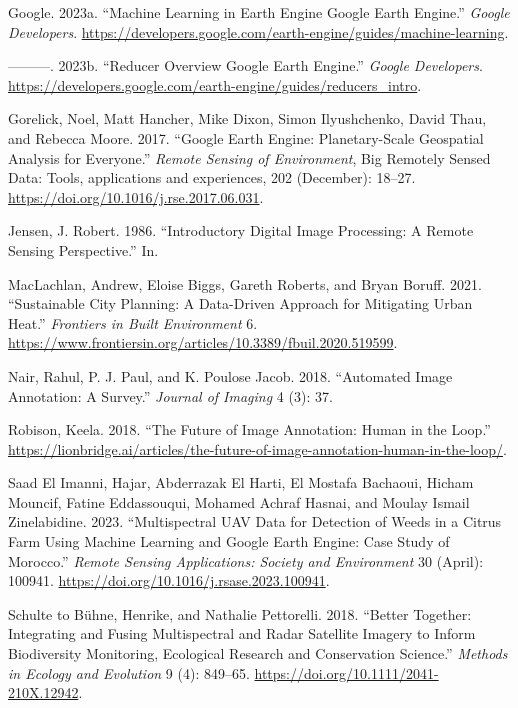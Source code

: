 \documentclass[
  letterpaper,
  DIV=11,
  numbers=noendperiod]{scrreprt}
\newlength{\cslhangindent}
\newlength{\cslentryspacingunit} %
\newenvironment{CSLReferences}[2] %
 {%
  \setlength{\parindent}{0pt}
  \ifodd #1
  \let\oldpar\par
  \def\par{\hangindent=\cslhangindent\oldpar}
  \fi
  \setlength{\parskip}{#2\cslentryspacingunit}
 }%
 {}
\begin{document}
\hypertarget{refs}{}
\begin{CSLReferences}{1}{0}
\leavevmode{}%
Google. 2023a. {``Machine {Learning} in {Earth} {Engine} {\textbar}
{Google} {Earth} {Engine}.''} \emph{Google Developers}.
\url{https://developers.google.com/earth-engine/guides/machine-learning}.

\leavevmode{}%
---------. 2023b. {``Reducer {Overview} {\textbar} {Google} {Earth}
{Engine}.''} \emph{Google Developers}.
\url{https://developers.google.com/earth-engine/guides/reducers_intro}.

\leavevmode{}%
Gorelick, Noel, Matt Hancher, Mike Dixon, Simon Ilyushchenko, David
Thau, and Rebecca Moore. 2017. {``Google {Earth} {Engine}:
{Planetary}-Scale Geospatial Analysis for Everyone.''} \emph{Remote
Sensing of Environment}, Big {Remotely} {Sensed} {Data}: Tools,
applications and experiences, 202 (December): 18--27.
\url{https://doi.org/10.1016/j.rse.2017.06.031}.

\leavevmode{}%
Jensen, J. Robert. 1986. {``Introductory Digital Image Processing: A
Remote Sensing Perspective.''} In.

\leavevmode{}%
MacLachlan, Andrew, Eloise Biggs, Gareth Roberts, and Bryan Boruff.
2021. {``Sustainable {City} {Planning}: {A} {Data}-{Driven} {Approach}
for {Mitigating} {Urban} {Heat}.''} \emph{Frontiers in Built
Environment} 6.
\url{https://www.frontiersin.org/articles/10.3389/fbuil.2020.519599}.

\leavevmode{}%
Nair, Rahul, P. J. Paul, and K. Poulose Jacob. 2018. {``Automated Image
Annotation: A Survey.''} \emph{Journal of Imaging} 4 (3): 37.

\leavevmode{}%
Robison, Keela. 2018. {``The Future of Image Annotation: Human in the
Loop.''}
\url{https://lionbridge.ai/articles/the-future-of-image-annotation-human-in-the-loop/}.

\leavevmode{}%
Saad El Imanni, Hajar, Abderrazak El Harti, El Mostafa Bachaoui, Hicham
Mouncif, Fatine Eddassouqui, Mohamed Achraf Hasnai, and Moulay Ismail
Zinelabidine. 2023. {``Multispectral {UAV} Data for Detection of Weeds
in a Citrus Farm Using Machine Learning and {Google} {Earth} {Engine}:
{Case} Study of {Morocco}.''} \emph{Remote Sensing Applications: Society
and Environment} 30 (April): 100941.
\url{https://doi.org/10.1016/j.rsase.2023.100941}.

\leavevmode{}%
Schulte to Bühne, Henrike, and Nathalie Pettorelli. 2018. {``Better
Together: {Integrating} and Fusing Multispectral and Radar Satellite
Imagery to Inform Biodiversity Monitoring, Ecological Research and
Conservation Science.''} \emph{Methods in Ecology and Evolution} 9 (4):
849--65. \url{https://doi.org/10.1111/2041-210X.12942}.

\end{CSLReferences}
\end{document}
